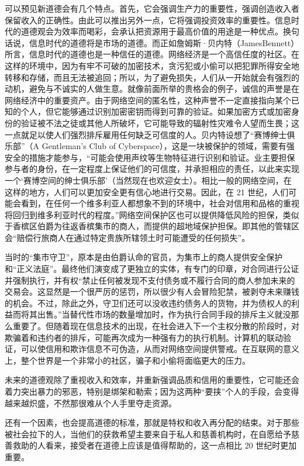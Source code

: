 可以预见新道德会有几个特点。首先，它会强调生产力的重要性，强调创造收入者保留收入的正确性。由此可以推出另外一点，它将强调投资效率的重要性。信息时代的道德观会为效率而喝彩，会承认把资源用于最高价值的用途是一种优点。换句话说，信息时代的道德将是市场的道德。而正如詹姆斯·贝内特（JamesBennett）所言，信息时代的道德也是一种信任的道德。网络经济是一个高信任度的社区。在这样的环境中，因为有牢不可破的加密技术，贪污犯或小偷可以把犯罪所得安全地转移和存储，而且无法被追回；所以，为了避免损失，人们从一开始就会有强烈的动机，避免与不诚实的人做生意。就像前面所举的贵格会的例子，诚信的声誉是在网络经济中的重要资产。由于网络空间的匿名性，这种声誉不一定直接指向某个已知的个人，但它能够通过识别加密密钥而得到可靠的验证。如果加密方式或加密身份的验证被不法之徒或其他人所破坏，它可能导致的辐射性灾难令人望而生畏；这一点就足以使人们强烈排斥雇用任何缺乏可信度的人。贝内特设想了“赛博绅士俱乐部”（A Gentleman’s Club of Cyberspace），这是一块被保护的领域，需要有强安全的措施才能参与，“可能会使用声纹等生物特征进行识别和验证。业主要担保参与者的身份，在一定程度上保证他们的可信度，并承担相应的责任，以此来实现一个‘赛博空间的绅士俱乐部’（当然现在也欢迎女士）。相比一般的网络空间，在这样的地方，人们可以更加安全更有信心地进行交易。因此，在 21 世纪，人们可能会看到，在任何一个维多利亚人都想象不到的环境中，社会对信用和品格的重视将回归到维多利亚时代的程度。”网络空间保护区也可以提供降低风险的担保，类似于香槟区伯爵为往返香槟集市的商人，而提供的超地域保护担保。即其他的管辖区会“赔偿行旅商人在通过特定贵族所辖领土时可能遭受的任何损失”。

当时的“集市守卫”，原本是由伯爵认命的官员，为集市上的商人提供安全保护和“正义法庭”。最终他们演变成了更独立的实体，有专门的印章，对合同进行公证并强制执行，并有权“禁止任何被发现不支付债务或不履行合同的商人参加未来的交易会。这显然是一个很严厉的惩罚，所以很少有人会冒险犯禁，被剥夺未来赚钱的机会。不过，除此之外，守卫们还可以没收违约债务人的货物，并为债权人的利益而将其出售。”当替代性市场的数量增加时，作为执行合同手段的排斥主义就没那么重要了。但随着现在信息技术的出现，在社会进入下一个主权分散的阶段时，对欺骗着和违约者的排斥，可能再次成为一种强有力的执行机制。计算机的联动验证，可以使信用和欺诈信息不可伪造，从而对网络空间提供警戒。在互联网的意义上，整个世界是一个非常小的社区，骗子和小偷将面临更大的压力。

未来的道德观除了重视收入和效率，并重新强调品质和信用的重要性，它可能还会着力突出暴力的邪恶，特别是绑架和勒索；因为这两种“要挟”个人的手段，会变得越来越炽盛，不然那很难从个人手里夺走资源。

还有一个因素，也会提高道德的标准，那就是特权和收入再分配的结束。对于那些被社会拉下的人，当他们的获救希望主要来自于私人和慈善机构时，在自愿给予慈善救助的人看来，接受者在道德上应该是值得帮助的，这一点相比 20 世纪时更加重要。

